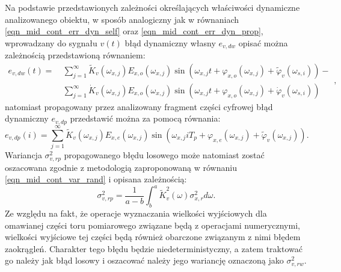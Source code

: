 Na podstawie przedstawionych zależności określających właściwości dynamiczne analizowanego obiektu, w sposób analogiczny jak w równaniach \eqref{eqn_mid_cont_err_dyn_self} oraz \eqref{eqn_mid_cont_err_dyn_prop}, wprowadzany do sygnału $v(t)$ błąd dynamiczny własny $e_{v,dw}$ opisać można zależnością przedstawioną równaniem:
\begin{equation}
\begin{split}
e_{v,dw} \left( t \right) = ~
& \sum _{j = 1} ^{\infty} \tilde{K}_{v} \left( \omega_{x,j} \right) E_{x,o} \left( \omega_{x,j} \right) \sin \left( \omega_{x,j} t + \varphi_{x,o} \left( \omega_{x,j} \right) + \tilde{\varphi}_{v} \left( \omega_{s,i} \right) \right) - \\
& \sum _{j = 1} ^{\infty} \dot{K}_{v} \left( \omega_{x,j} \right) E_{x,o} \left( \omega_{x,j} \right) \sin \left( \omega_{x,j} t + \varphi_{x,o} \left( \omega_{x,j} \right) + \dot{\varphi}_{v} \left( \omega_{s,i} \right) \right)
\end{split}
\label{eqn_mid_disc_err_dyn_self},
\end{equation}
natomiast propagowany przez analizowany fragment części cyfrowej błąd dynamiczny $e_{v,dp}$ przedstawić można za pomocą równania:
\begin{equation}
e_{v,dp} \left( i \right) = \sum _{j = 1} ^{\infty} \tilde{K}_{v} \left( \omega_{x,j} \right) E_{x,e} \left( \omega_{x,j} \right) \sin \left( \omega_{x,j} iT_{p} + \varphi_{x,e} \left( \omega_{x,j} \right) + \tilde{\varphi}_{v} \left( \omega_{x,j} \right) \right) \label{eqn_mid_disc_err_dyn_prop}.
\end{equation}
Wariancja $\sigma_{v,rp}^{2}$ propagowanego błędu losowego może natomiast zostać oszacowana zgodnie z metodologią zaproponowaną w równaniu \eqref{eqn_mid_cont_var_rand} i opisana zależnością:
\begin{equation}
\sigma_{v,rp}^{2} = \frac{1}{a - b} \int _{b} ^{a} \tilde{K}_{v}^{2} \left( \omega \right) \sigma_{x,r}^{2} d\omega \label{eqn_mid_disc_var_rand}.
\end{equation}
Ze względu na fakt, że operacje wyznaczania wielkości wyjściowych dla omawianej części toru pomiarowego związane będą z operacjami numerycznymi, wielkości wyjściowe tej części będą również obarczone związanym z nimi błędem zaokrągleń. Charakter tego błędu będzie niedeterministyczny, a zatem traktować go należy jak błąd losowy i oszacować należy jego wariancję oznaczoną jako $\sigma_{v,rw}^{2}$.

